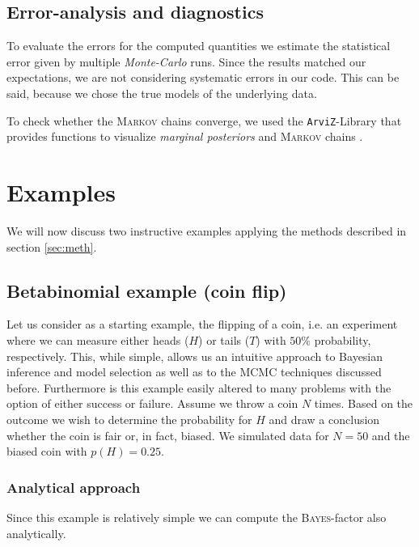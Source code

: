 \documentclass[%
 reprint,
 amsmath,amssymb,
 aps,
]{revtex4-1}
\begin{document}
\subsection{Error-analysis and diagnostics}
\noindent To evaluate the errors for the computed quantities we estimate the statistical error given by multiple \emph{Monte-Carlo} runs. Since the results matched our expectations, we are not considering systematic errors in our code. This can be said, because we chose the true models of the underlying data.

To check whether the \textsc{Markov} chains converge, we used the \texttt{ArviZ}-Library that provides functions to visualize \emph{marginal posteriors} and \textsc{Markov} chains \cite{ArviZ}. 
\section{Examples}\label{sec:examples}
\noindent We will now discuss two instructive examples applying the methods described in section \eqref{sec:meth}.

\subsection{Betabinomial example (coin flip)}
\noindent Let us consider as a starting example, the flipping of a coin, i.e. an experiment where we can measure either heads ($H$) or tails ($T$) with $50\%$ probability, respectively. This, while simple, allows us an intuitive approach to Bayesian inference and model selection as well as to the MCMC techniques discussed before. Furthermore is this example easily altered to many problems with the option of either success or failure. Assume we throw a coin $N$ times.  Based on the outcome we wish to determine the probability for $H$ and draw a conclusion whether the coin is fair or, in fact, biased. We simulated data for $N=50$ and the biased coin with $p(H)=0.25$.
\subsubsection{\textbf{Analytical approach}}
\noindent Since this example is relatively simple we can compute the \textsc{Bayes}-factor also analytically.
\end{document}

